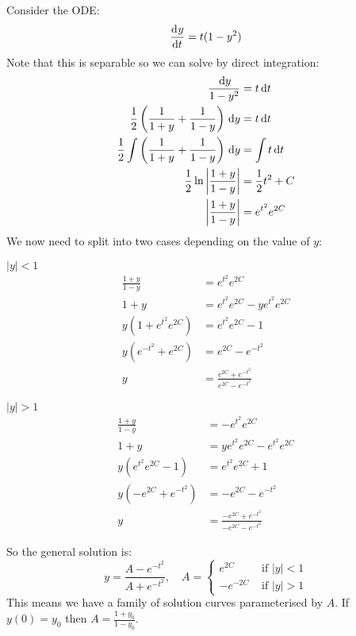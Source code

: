 \documentclass[../main.tex]{subfiles}
\begin{document}
\begin{example}
  Consider the ODE:
  \[
    \deriv{y}{t} = t(1 - y^2)
  \]
  Note that this is separable so we can solve by direct integration:
  \begin{align*}
    \frac{\,\mathrm{d} y}{1 - y^2} &= t \,\mathrm{d} t \\
    \frac{1}{2}\left(\frac{1}{1+y} + \frac{1}{1-y}\right)\,\mathrm{d} y &= t\,\mathrm{d} t \\
    \frac{1}{2} \int \left(\frac{1}{1+y} + \frac{1}{1-y}\right) \,\mathrm{d} y &= \int t \,\mathrm{d} t \\
    \frac{1}{2}\ln \left\lvert \frac{1 + y}{1-y} \right\rvert &= \frac{1}{2}t^2 + C \\
    \left\lvert \frac{1 + y}{1 - y} \right\rvert &= e^{t^2} e^{2C}
  \end{align*}
  We now need to split into two cases depending on the value of $y$:
  \begin{proofcases}
    \begin{case}{$|y| < 1$}
      \vspace{-2em}
      \begin{align*}
        \frac{1 + y}{1 - y} &= e^{t^2} e^{2C} \\
        1 + y &= e^{t^2} e^{2C} - ye^{t^2} e^{2C} \\
        y(1 + e^{t^2}e^{2C}) &= e^{t^2} e^{2C} - 1 \\
        y(e^{-t^2} + e^{2C}) &= e^{2C} - e^{-t^2} \\
        y &= \frac{e^{2C} + e^{-t^2}}{e^{2C} - e^{-t^2}}
      \end{align*}
    \end{case}
    \begin{case}{$|y| > 1$}
      \vspace{-2em}
      \begin{align*}
        \frac{1 + y}{1 - y} &= - e^{t^2} e^{2C} \\
        1 + y &= ye^{t^2} e^{2C} - e^{t^2}e^{2C} \\
        y(e^{t^2}e^{2C} - 1) &= e^{t^2} e^{2C} + 1 \\
        y(-e^{2C} + e^{-t^2}) &= -e^{2C} - e^{-t^2} \\
        y &= \frac{-e^{2C} + e^{-t^2}}{-e^{2C} - e^{-t^2}}
      \end{align*}
    \end{case}
  \end{proofcases}
  So the general solution is:
  \[
    y = \frac{A - e^{-t^2}}{A + e^{-t^2}},\quad A = \begin{cases}
    e^{2C} & \text{ if } |y| < 1 \\
    -e^{-2C} & \text{ if } |y| > 1
    \end{cases}
  \]
  This means we have a family of solution curves parameterised by $A$.
  If $y(0) = y_0$ then $A = \frac{1 + y_0}{1 - y_0}$.
  \begin{center}
\end{center}
\end{example}
\end{document}
